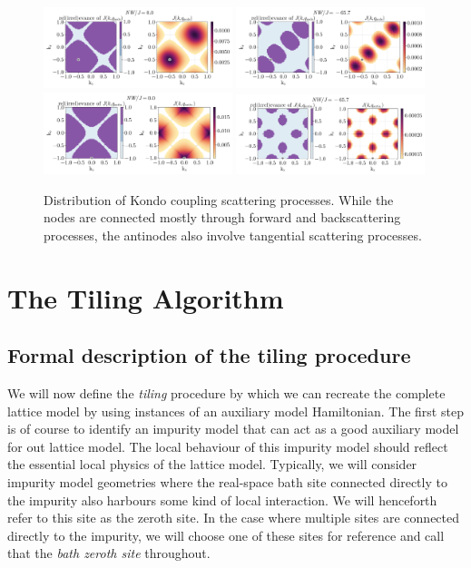 \documentclass[reprint,hidelinks]{revtex4-2}
\begin{document}
\begin{figure}[htpb]
	\centering
	\includegraphics[width=0.49\textwidth]{kondoCoupNodeMap-1.pdf}
	\includegraphics[width=0.49\textwidth]{kondoCoupNodeMap-6.pdf}\\
	\includegraphics[width=0.49\textwidth]{kondoCoupAntinodeMap-1.pdf}
	\includegraphics[width=0.49\textwidth]{kondoCoupAntinodeMap-6.pdf}
	\caption{Distribution of Kondo coupling scattering processes. While the nodes are connected mostly through forward and backscattering processes, the antinodes also involve tangential scattering processes.}
	\label{kondoMaps}
\end{figure}

\section{The Tiling Algorithm}

\subsection{Formal description of the tiling procedure}\label{formalDescription}
We will now define the {\it tiling} procedure by which we can recreate the complete lattice model by using instances of an auxiliary model Hamiltonian. The first step is of course to identify an impurity model that can act as a good auxiliary model for out lattice model. The local behaviour of this impurity model should reflect the essential local physics of the lattice model. Typically, we will consider impurity model geometries where the real-space bath site connected directly to the impurity also harbours some kind of local interaction. We will henceforth refer to this site as the zeroth site. In the case where multiple sites are connected directly to the impurity, we will choose one of these sites for reference and call that the {\it bath zeroth site} throughout.
\end{document}
